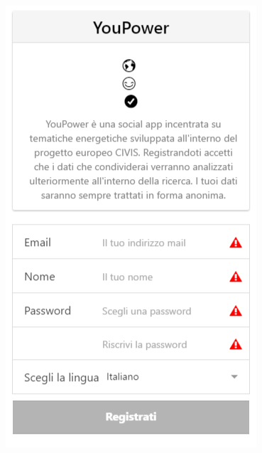 \begin{enumerate}
\begin{figure}
\begin{center}
\begin{minipage}[htb]{0.45\linewidth}
         \includegraphics[width=1\linewidth]{img/registrationpart.png}  
        \end{minipage}
 	\hfill 
        \begin{minipage}[htb]{0.45\linewidth}    

\end{minipage}
\end{center}
\end{figure}
\end{enumerate}

